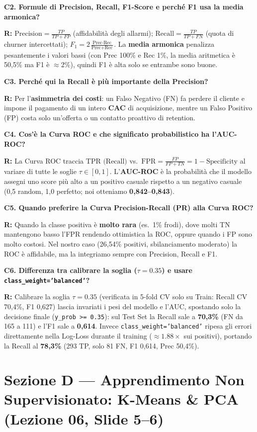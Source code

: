 \documentclass[10pt, a4paper]{article}
\newcommand{\qa}[2]{%
  \par\vspace{4pt}\noindent\textbf{\color{PrimaryNavy}#1}\par\vspace{1pt}%
  \noindent\textbf{\color{SecondaryBlue}R:} #2\par\vspace{2pt}%
}
\begin{document}
\qa{C2. Formule di Precision, Recall, F1-Score e perché F1 usa la media armonica?}{
$\text{Precision} = \frac{TP}{TP+FP}$ (affidabilità degli allarmi); $\text{Recall} = \frac{TP}{TP+FN}$ (quota di churner intercettati); $F_1 = 2\frac{\text{Prec}\cdot\text{Rec}}{\text{Prec}+\text{Rec}}$. La \textbf{media armonica} penalizza pesantemente i valori bassi (con Prec 100\% e Rec 1\%, la media aritmetica è 50,5\% ma F1 è $\approx 2\%$), quindi F1 è alta solo se entrambe sono buone.}

\qa{C3. Perché qui la Recall è più importante della Precision?}{
Per l'\textbf{asimmetria dei costi}: un Falso Negativo (FN) fa perdere il cliente e impone il pagamento di un intero \textbf{CAC} di acquisizione, mentre un Falso Positivo (FP) costa solo un'offerta o un contatto proattivo di retention.}

\qa{C4. Cos'è la Curva ROC e che significato probabilistico ha l'AUC-ROC?}{
La Curva ROC traccia $\text{TPR (Recall)}$ vs.\ $\text{FPR} = \frac{FP}{FP+TN} = 1 - \text{Specificity}$ al variare di tutte le soglie $\tau \in [0,1]$. L'\textbf{AUC-ROC} è la probabilità che il modello assegni uno score più alto a un positivo casuale rispetto a un negativo casuale (0,5 random, 1,0 perfetto; noi otteniamo \textbf{0,842--0,843}).}

\qa{C5. Quando preferire la Curva Precision-Recall (PR) alla Curva ROC?}{
Quando la classe positiva è \textbf{molto rara} (es.\ 1\% frodi), dove molti TN mantengono basso l'FPR rendendo ottimistica la ROC, oppure quando i FP sono molto costosi. Nel nostro caso (26,54\% positivi, sbilanciamento moderato) la ROC è affidabile, ma la integriamo sempre con Precision, Recall e F1.}

\qa{C6. Differenza tra calibrare la soglia ($\tau=0.35$) e usare \texttt{class\_weight='balanced'}?}{
Calibrare la soglia $\tau=0.35$ (verificata in 5-fold CV solo su Train: Recall CV 70,4\%, F1 0,627) lascia invariati i pesi del modello e l'AUC, spostando solo la decisione finale (\texttt{y\_prob >= 0.35}): sul Test Set la Recall sale a \textbf{70,3\%} (FN da 165 a 111) e l'F1 sale a \textbf{0,614}. Invece \texttt{class\_weight='balanced'} ripesa gli errori direttamente nella Log-Loss durante il training ($\approx 1.88\times$ sui positivi), portando la Recall al \textbf{78,3\%} (293 TP, solo 81 FN, F1 0,614, Prec 50,4\%).}

\section*{Sezione D --- Apprendimento Non Supervisionato: K-Means \& PCA (Lezione 06, Slide 5--6)}
\end{document}
